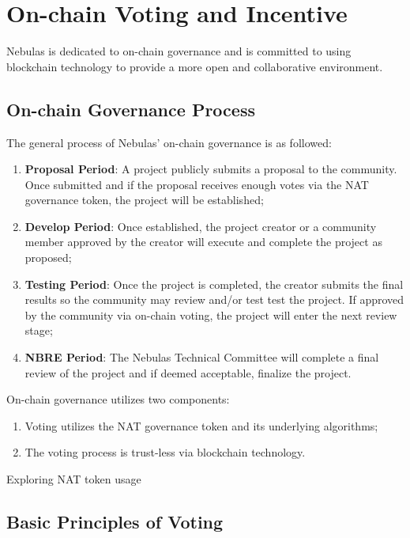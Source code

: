 \section{On-chain Voting and Incentive}

Nebulas is dedicated to on-chain governance and is committed to using blockchain technology to provide a more open and collaborative environment.

\subsection{On-chain Governance Process}
\label{governance}

The general process of Nebulas' on-chain governance is as followed:

\begin{enumerate}
	\item \textbf{Proposal Period}: A project publicly submits a proposal to the community. Once submitted and if the proposal receives enough votes via the NAT governance token, the project will be established; 
	\item \textbf{Develop Period}: Once established, the project creator or a community member approved by the creator will execute and complete the project as proposed;
	\item \textbf{Testing Period}: Once the project is completed, the creator submits the final results so the community may review and/or test test the project. If approved by the community via on-chain voting, the project will enter the next review stage;
	\item \textbf{NBRE Period}: The Nebulas Technical Committee will complete a final review of the project and if deemed acceptable, finalize the project.
\end{enumerate}

On-chain governance utilizes two components:

\begin{enumerate}
	\item Voting utilizes the NAT governance token and its underlying algorithms;
	\item The voting process is trust-less via blockchain technology.
\end{enumerate}

Exploring NAT token usage

\subsection{Basic Principles of Voting}

